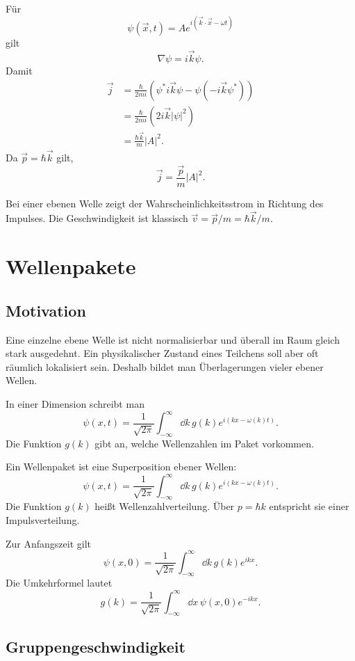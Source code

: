Für
\[
    \psi(\vec{x},t)=Ae^{i(\vec{k}\cdot\vec{x}-\omega t)}
\]
gilt
\[
    \nabla\psi=i\vec{k}\psi.
\]
Damit
\[
\begin{aligned}
    \vec{j}
    &=\frac{\hbar}{2mi}\left(\psi^* i\vec{k}\psi-\psi(-i\vec{k}\psi^*)\right)\\
    &=\frac{\hbar}{2mi}\left(2i\vec{k}|\psi|^2\right)\\
    &=\frac{\hbar\vec{k}}{m}|A|^2.
\end{aligned}
\]
Da $\vec{p}=\hbar\vec{k}$ gilt,
\[
    \vec{j}=\frac{\vec{p}}{m}|A|^2.
\]

\begin{conceptbox}
Bei einer ebenen Welle zeigt der Wahrscheinlichkeitsstrom in Richtung des Impulses. Die Geschwindigkeit ist klassisch $\vec{v}=\vec{p}/m=\hbar\vec{k}/m$.
\end{conceptbox}

\section{Wellenpakete}

\subsection{Motivation}

Eine einzelne ebene Welle ist nicht normalisierbar und überall im Raum gleich stark ausgedehnt. Ein physikalischer Zustand eines Teilchens soll aber oft räumlich lokalisiert sein. Deshalb bildet man Überlagerungen vieler ebener Wellen.

In einer Dimension schreibt man
\[
    \psi(x,t)=\frac{1}{\sqrt{2\pi}}\int_{-\infty}^{\infty}\dd k\,g(k)e^{i(kx-\omega(k)t)}.
\]
Die Funktion $g(k)$ gibt an, welche Wellenzahlen im Paket vorkommen.

\begin{definitionbox}
Ein Wellenpaket ist eine Superposition ebener Wellen:
\[
    \psi(x,t)=\frac{1}{\sqrt{2\pi}}\int_{-\infty}^{\infty}\dd k\,g(k)e^{i(kx-\omega(k)t)}.
\]
Die Funktion $g(k)$ heißt Wellenzahlverteilung. Über $p=\hbar k$ entspricht sie einer Impulsverteilung.
\end{definitionbox}

Zur Anfangszeit gilt
\[
    \psi(x,0)=\frac{1}{\sqrt{2\pi}}\int_{-\infty}^{\infty}\dd k\,g(k)e^{ikx}.
\]
Die Umkehrformel lautet
\[
    g(k)=\frac{1}{\sqrt{2\pi}}\int_{-\infty}^{\infty}\dd x\,\psi(x,0)e^{-ikx}.
\]

\subsection{Gruppengeschwindigkeit}

